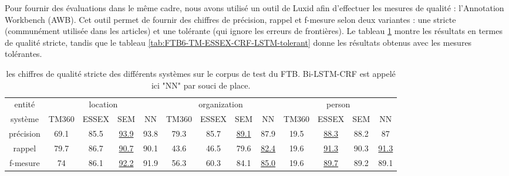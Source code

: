 \documentclass[12pt,a4paper,times,twoside,openright]{report}
\begin{document}
Pour fournir des évaluations dans le même cadre, nous avons utilisé un outil de Luxid afin d'effectuer les mesures de qualité : l'Annotation Workbench (AWB). Cet outil permet de fournir des chiffres de précision, rappel et f-mesure selon deux variantes : une stricte (communément utilisée dans les articles) et une tolérante (qui ignore les erreurs de frontières). Le tableau \ref{tab:FTB6-TM-ESSEX-CRF-LSTM-strict} montre les résultats en termes de qualité stricte, tandis que le tableau \ref{tab:FTB6-TM-ESSEX-CRF-LSTM-tolerant} donne les résultats obtenus avec les mesures tolérantes.

\begin{table}[ht!]
\centering
\scriptsize
\begin{tabular}{|c|cccc|cccc|cccc|}
\hline
entité    & \multicolumn{4}{c|}{location}           & \multicolumn{4}{c|}{organization}                   & \multicolumn{4}{c|}{person} \\
système   & TM360 & ESSEX & SEM              & NN   & TM360 & ESSEX & SEM              & NN               & TM360 & ESSEX           & SEM & NN\\
\hline
précision & 69.1  & 85.5  & \underline{93.9} & 93.8 & 79.3  & 85.7  & \underline{89.1} & 87.9             & 19.5 & \underline{88.3} & 88.2 & 87 \\
rappel    & 79.7  & 86.7  & \underline{90.7} & 90.1 & 43.6  & 46.5  & 79.6             & \underline{82.4} & 19.6 & \underline{91.3} & 90.3 & \underline{91.3} \\
f-mesure  & 74    & 86.1  & \underline{92.2} & 91.9 & 56.3  & 60.3  & 84.1             & \underline{85.0} & 19.6 & \underline{89.7} & 89.2 & 89.1 \\
\hline
\end{tabular}
\caption{les chiffres de qualité stricte des différents systèmes sur le corpus de test du FTB. Bi-LSTM-CRF est appelé ici "NN" par souci de place.}
\label{tab:FTB6-TM-ESSEX-CRF-LSTM-strict}
\end{table}
\end{document}
